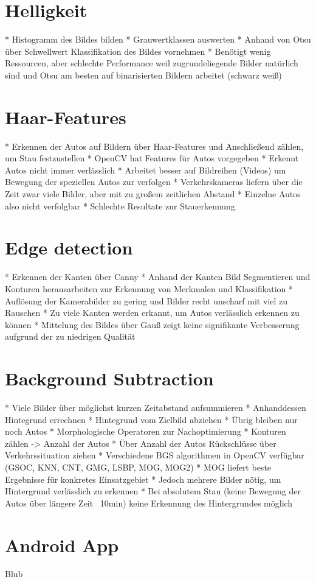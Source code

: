\section{Helligkeit}
* Histogramm des Bildes bilden
* Grauwertklassen auswerten
* Anhand von Otsu über Schwellwert Klassifikation des Bildes vornehmen
* Benötigt wenig Ressourcen, aber schlechte Performance weil zugrundeliegende Bilder 
	natürlich sind und Otsu am besten auf binarisierten Bildern arbeitet (schwarz weiß)
	
\section{Haar-Features}
* Erkennen der Autos auf Bildern über Haar-Features und Anschließend zählen, um Stau festzustellen
* OpenCV hat Features für Autos vorgegeben
* Erkennt Autos nicht immer verlässlich
* Arbeitet besser auf Bildreihen (Videos) um Bewegung der speziellen Autos zur verfolgen
* Verkehrskameras liefern über die Zeit zwar viele Bilder, aber mit zu großem zeitlichen Abstand
* Einzelne Autos also nicht verfolgbar
* Schlechte Resultate zur Stauerkennung

\section{Edge detection}
* Erkennen der Kanten über Canny
* Anhand der Kanten Bild Segmentieren und Konturen herausarbeiten zur Erkennung von Merkmalen und Klassifikation
* Auflösung der Kamerabilder zu gering und Bilder recht unscharf mit viel zu Rauschen
* Zu viele Kanten werden erkannt, um Autos verlässlich erkennen zu können
* Mittelung des Bildes über Gauß zeigt keine signifikante Verbesserung aufgrund der zu niedrigen Qualität
	
\section{Background Subtraction}
* Viele Bilder über möglichst kurzen Zeitabstand aufsummieren
* Anhanddessen Hintegrund errechnen
* Hintegrund vom Zielbild abziehen
* Übrig bleiben nur noch Autos
* Morphologische Operatoren zur Nachoptimierung
* Konturen zählen -> Anzahl der Autos
* Über Anzahl der Autos Rückschlüsse über Verkehrssituation ziehen
* Verschiedene BGS algorithmen in OpenCV verfügbar (GSOC, KNN, CNT, GMG, LSBP, MOG, MOG2)
* MOG liefert beste Ergebnisse für konkretes Einsatzgebiet
* Jedoch mehrere Bilder nötig, um Hintergrund verlässlich zu erkennen
* Bei absolutem Stau (keine Bewegung der Autos über längere Zeit ~10min) keine Erkennung des Hintergrundes möglich

\section{Android App}
Blub
